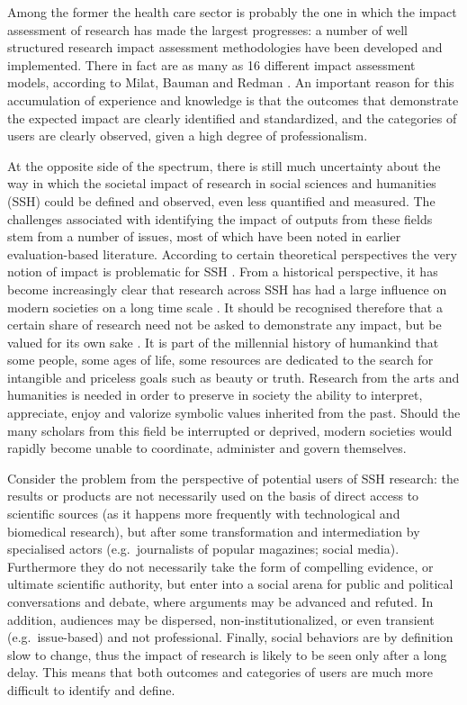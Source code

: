 \documentclass[]{book}
\theoremstyle{definition}
\theoremstyle{definition}
\theoremstyle{definition}
\theoremstyle{remark}
\begin{document}
Among the former the health care sector is probably the one in which the
impact assessment of research has made the largest progresses: a number
of well structured research impact assessment methodologies have been
developed and implemented. There in fact are as many as 16 different
impact assessment models, according to Milat, Bauman and Redman
\citep{milat2015narrative}. An important reason for this accumulation of
experience and knowledge is that the outcomes that demonstrate the
expected impact are clearly identified and standardized, and the
categories of users are clearly observed, given a high degree of
professionalism.

At the opposite side of the spectrum, there is still much uncertainty
about the way in which the societal impact of research in social
sciences and humanities (SSH) could be defined and observed, even less
quantified and measured. The challenges associated with identifying the
impact of outputs from these fields stem from a number of issues, most
of which have been noted in earlier evaluation-based literature.
According to certain theoretical perspectives the very notion of impact
is problematic for SSH \citep{blasi2018ssh}. From a historical
perspective, it has become increasingly clear that research across SSH
has had a large influence on modern societies on a long time scale
\citep{bod2013new}. It should be recognised therefore that a certain
share of research need not be asked to demonstrate any impact, but be
valued for its own sake \citep{small2013value}. It is part of the
millennial history of humankind that some people, some ages of life,
some resources are dedicated to the search for intangible and priceless
goals such as beauty or truth. Research from the arts and humanities is
needed in order to preserve in society the ability to interpret,
appreciate, enjoy and valorize symbolic values inherited from the past.
Should the many scholars from this field be interrupted or deprived,
modern societies would rapidly become unable to coordinate, administer
and govern themselves.

Consider the problem from the perspective of potential users of SSH
research: the results or products are not necessarily used on the basis
of direct access to scientific sources (as it happens more frequently
with technological and biomedical research), but after some
transformation and intermediation by specialised actors
(e.g.~journalists of popular magazines; social media). Furthermore they
do not necessarily take the form of compelling evidence, or ultimate
scientific authority, but enter into a social arena for public and
political conversations and debate, where arguments may be advanced and
refuted. In addition, audiences may be dispersed, non-institutionalized,
or even transient (e.g.~issue-based) and not professional. Finally,
social behaviors are by definition slow to change, thus the impact of
research is likely to be seen only after a long delay. This means that
both outcomes and categories of users are much more difficult to
identify and define.
\end{document}
